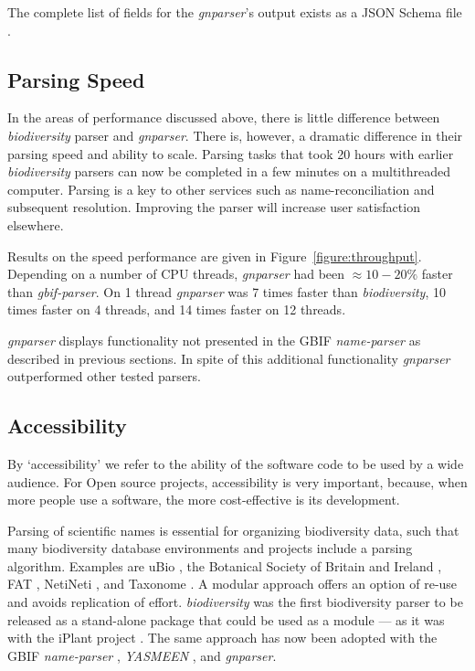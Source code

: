 \documentclass{bmcart}
\begin{document}
The complete list of fields for the \textit{gnparser}'s output exists as a JSON Schema file \cite{gnparser-json}.

\subsection*{Parsing Speed}

In the areas of performance discussed above, there is little difference between \textit{biodiversity} parser and \textit{gnparser}. There is, however, a dramatic difference in their parsing speed and ability to scale. Parsing tasks that took 20 hours with earlier \textit{biodiversity} parsers can now be completed in a few minutes on a multithreaded computer. Parsing is a key to other services such as name-reconciliation and subsequent resolution.  Improving the parser will increase user satisfaction elsewhere.

Results on the speed performance are given in Figure~\ref{figure:throughput}.  Depending on a number of CPU threads, \textit{gnparser} had been $\approx10-20\%$ faster than \textit{gbif-parser}. On 1 thread \textit{gnparser} was 7 times faster than \textit{biodiversity}, 10 times faster on 4 threads, and 14 times faster on 12 threads.

\textit{gnparser} displays functionality not presented in the GBIF \textit{name-parser} as described in previous sections. In spite of this additional functionality \textit{gnparser} outperformed other tested parsers.

\subsection*{Accessibility}

By `accessibility' we refer to the ability of the software code to be used by a wide audience. For Open source projects, accessibility is very important, because, when more people use a software, the more cost-effective is its development.

Parsing of scientific names is essential for organizing biodiversity data, such that many biodiversity database environments and projects include a parsing algorithm. Examples are uBio \cite{ubio:parser}, the Botanical Society of Britain and Ireland \cite{botsociety:parser}, FAT \cite{Sautter2006}, NetiNeti \cite{Akella2012}, and Taxonome \cite{Kluyver2013}. A modular approach offers an option of re-use and avoids replication of effort. \textit{biodiversity} was the first biodiversity parser to be released as a stand-alone package that could be used as a module --- as it was with the iPlant project \cite{Boyle2013}.  The same approach has now been adopted with the GBIF \textit{name-parser} \cite{gbifNameParser}, \textit{YASMEEN} \cite{VandenBerghe2015}, and \textit{gnparser}.
\end{document}
